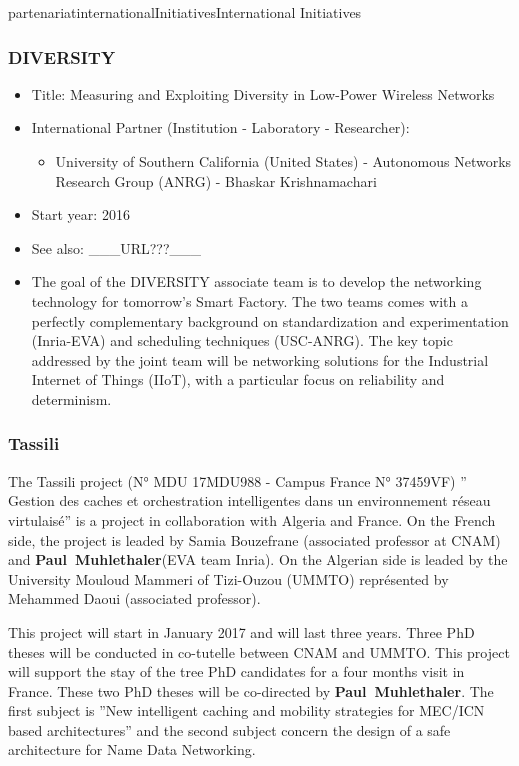 \documentclass{ra2016}
\newcommand{\paul}  {\textbf{Paul~Muhlethaler}}
\begin{document}
\begin{module}{partenariat}{internationalInitiatives}{International Initiatives}
\subsubsection{DIVERSITY}
\begin{itemize}
 \item Title: Measuring and Exploiting Diversity in Low-Power Wireless Networks
 \item International Partner (Institution -  Laboratory - Researcher):
 \begin{itemize}
    \item University of Southern California (United States)  
 - Autonomous Networks Research Group (ANRG) - Bhaskar Krishnamachari
 \end{itemize}
 \item Start year: 2016\item See also: \_\_\_URL???\_\_\_
 \item The goal of the DIVERSITY associate team is to develop the networking technology for tomorrow's Smart Factory. The two teams comes with a perfectly complementary background on standardization and experimentation (Inria-EVA) and scheduling techniques (USC-ANRG). The key topic addressed by the joint team will be networking solutions for the Industrial Internet of Things (IIoT), with a particular focus on reliability and determinism. 
\end{itemize}

\subsubsection{Tassili}

The Tassili project (N° MDU 17MDU988  - Campus France  N° 37459VF) '' Gestion des caches et orchestration intelligentes dans un environnement réseau virtulaisé'' is a project in collaboration with Algeria and France. On the 
French side, the project is leaded by Samia Bouzefrane (associated professor at CNAM) and \paul (EVA team Inria). 
On the Algerian side is leaded by the University Mouloud Mammeri of Tizi-Ouzou (UMMTO) représented by Mehammed Daoui (associated professor).

This project will start in January 2017 and will last three years. Three PhD theses will be conducted in co-tutelle 
between CNAM and UMMTO. This project will support the stay of the tree PhD candidates for  a four months 
visit in France. These two PhD theses will be co-directed by \paul. The first subject is ''New intelligent caching and mobility strategies for MEC/ICN based architectures'' and the second subject concern the design of a safe  architecture for Name Data Networking. 



\end{module}
\end{document}
